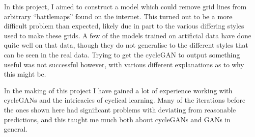 In this project, I aimed to construct a model which could remove grid lines from arbitrary ``battlemaps'' found on the internet. This turned out to be a more difficult problem than expected, likely due in part to the various differing styles used to make these grids. A few of the models trained on artificial data have done quite well on that data, though they do not generalise to the different styles that can be seen in the real data. Trying to get the cycleGAN to output something useful was not successful however, with various different explanations as to why this might be.

In the making of this project I have gained a lot of experience working with cycleGANs and the intricacies of cyclical learning. Many of the iterations before the ones shown here had significant problems with deviating from reasonable predictions, and this taught me much both about cycleGANs and GANs in general.
